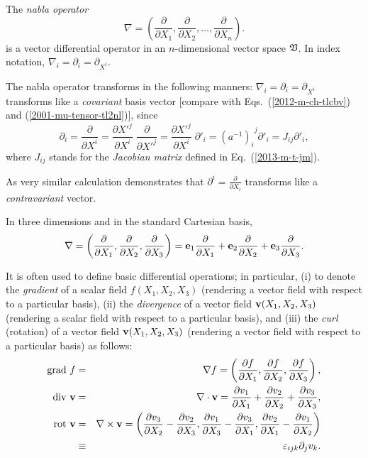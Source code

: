 The {\em nabla operator}
\begin{equation}
\nabla =\left(
\frac{\partial }{\partial X_1},
\frac{\partial }{\partial X_2},
\ldots ,
\frac{\partial }{\partial X_n}
\right).
\end{equation}
is a vector differential operator in an $n$-dimensional vector space $\frak V$.
In index notation, $\nabla_i  =\partial_i =\partial_{X^i}$.

The nabla operator transforms in the following manners:
$\nabla_i  =\partial_i =\partial_{X^i}$ transforms like a {\em covariant} basis vector
[compare with Eqs.~(\ref{2012-m-ch-tlcbv}) and (\ref{2001-mu-tensor-tl2nl})], since
\begin{equation}
\partial_i =
\frac{\partial }{\partial X^i}
=
\frac{\partial {X'}^j}{\partial X^i}
\;
\frac{\partial }{\partial {X'}^j}
=
\frac{\partial {X'}^j}{\partial X^i}
\;
\partial'_i
=
{{(a^{-1})}_i}^j
\partial'_i
=
J_{ij}
\partial'_i,
\end{equation}
where $J_{ij}$ stands for the {\em  Jacobian matrix} defined in Eq.~(\ref{2013-m-t-jm}).

As very similar calculation demonstrates that $\partial^i=\frac{\partial }{\partial X_i}$ transforms like a {\em contravariant} vector.


In three dimensions and in the standard Cartesian basis,
\begin{equation}
\nabla = \left(
\frac{\partial }{\partial X_1},
\frac{\partial }{\partial X_2},
\frac{\partial }{\partial X_3}
\right)
={\bf e}_1\frac{\partial }{\partial X_1}
+{\bf e}_2\frac{\partial }{\partial X_2}
+{\bf e}_3\frac{\partial }{\partial X_3}
.
\end{equation}


It is often used to define basic differential operations;
in particular, (i) to denote the {\em gradient} of a scalar field $f(X_1,X_2,X_3)$ (rendering a vector field with respect to a particular basis),
(ii) the {\em divergence} of a vector field ${\bf v}(X_1,X_2,X_3)$
(rendering a scalar field with respect to a particular basis), and
(iii) the {\em curl} (rotation) of a vector field  ${\bf v}(X_1,X_2,X_3)$ (rendering a vector field with respect to a particular basis)
as follows:
\begin{eqnarray}
\textrm{grad } f &=& \nabla f = \left(
\frac{\partial f}{\partial X_1},
\frac{\partial f}{\partial X_2},
\frac{\partial f}{\partial X_3}
\right)  ,\\
\textrm{div }  {\bf v} &=& \nabla \cdot {\bf v} =
\frac{\partial v_1}{\partial X_1}+
\frac{\partial v_2}{\partial X_2}+
\frac{\partial v_3}{\partial X_3}
  ,\\
\textrm{rot } {\bf v} &=& \nabla \times {\bf v} = \left(
\frac{\partial v_3}{\partial X_2}-
\frac{\partial v_2}{\partial X_3}
,
\frac{\partial v_1}{\partial X_3}-
\frac{\partial v_3}{\partial X_1}
,
\frac{\partial v_2}{\partial X_1}-
\frac{\partial v_1}{\partial X_2}
\right)          \\
&\equiv& \varepsilon_{ijk} \partial_j v_k.
\end{eqnarray}

